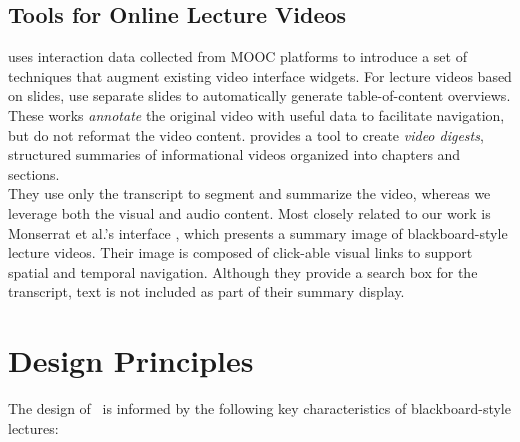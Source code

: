 \subsection{Tools for Online Lecture Videos}
\cite{kim2014data} uses interaction data collected from MOOC platforms to introduce a set of techniques that augment existing video interface widgets. For lecture videos based on slides, \cite{li2000browsing} use separate slides to automatically generate table-of-content overviews. These works \textit{annotate} the original video with useful data to facilitate navigation, but do not reformat the video content. \cite{pavel2014video} provides a tool to create \textit{video digests}, structured summaries of informational videos organized into chapters and sections.\\
%
They use  only the transcript to segment and summarize the video, whereas we leverage both the visual and audio content. Most closely related to our work is Monserrat et al.'s interface \cite{monserrat2013notevideo}, which presents a summary image of blackboard-style lecture videos. Their image is composed of click-able visual links to support spatial and temporal navigation. Although they provide a search box for the transcript, text is not included as part of their summary display.

\section{Design Principles}
\label{sec:principles}
%
The design of \systemname\ is informed by the following key characteristics of blackboard-style lectures:
%
